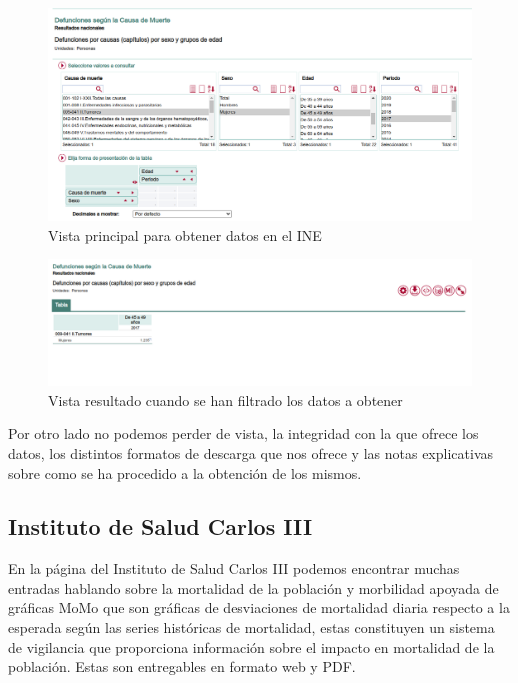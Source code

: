 \begin{figure}[]
	\centering
	\includegraphics[scale=0.5]{doc/logos/imgs/ine1.png}
	\caption{ \cite{INE}  Vista principal para obtener datos en el INE }
    \label{fig:worst_f_value}
\end{figure}

\begin{figure}[]
	\centering
	\includegraphics[scale=0.5]{doc/logos/imgs/ine2.png}
	\caption{ \cite{INE} Vista resultado cuando se han filtrado los datos a obtener }
    \label{fig:worst_f_value}
\end{figure}
Por otro lado no podemos perder de vista, la integridad con la que ofrece los datos, los distintos formatos
de descarga que nos ofrece y las notas explicativas sobre como se ha procedido a la obtención de los mismos.

\subsection{Instituto de Salud Carlos III}
En la página del Instituto de Salud Carlos III \cite{isciii} podemos encontrar muchas entradas hablando sobre
la mortalidad de la población y morbilidad apoyada de \cite{momo} gráficas MoMo que son gráficas de desviaciones de mortalidad
diaria respecto a la esperada según las series históricas de mortalidad, estas constituyen un sistema de vigilancia
que proporciona información sobre el impacto en mortalidad de la población. Estas son entregables en formato web y PDF.

